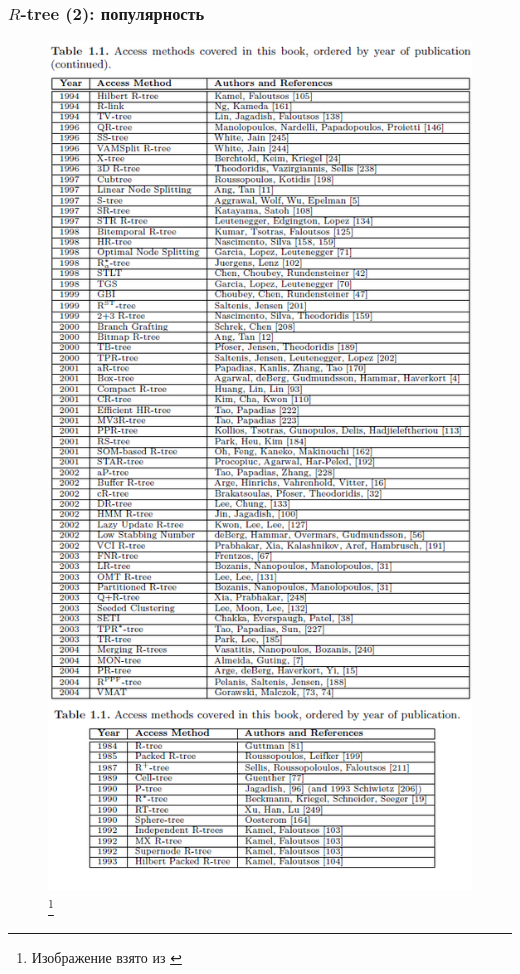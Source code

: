 \documentclass{beamer}
\begin{document}
\begin{frame}
\frametitle{$R$-tree (2): популярность}

\begin{figure}[htb]
\includegraphics[width=\textwidth,height=0.8\textheight,keepaspectratio]{r-tree-works.png} 
\footnote{\tiny{Изображение взято из \cite{Manolopoulos2005}}}
\end{figure}   

\end{frame}
\end{document}
